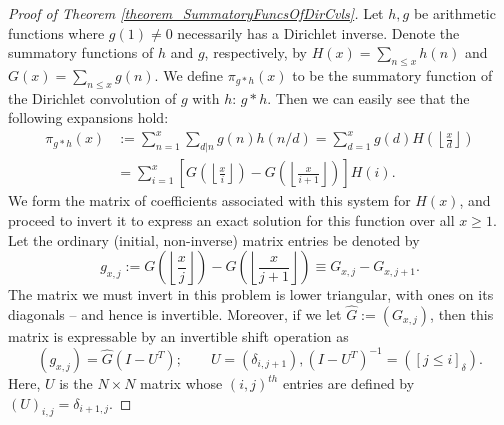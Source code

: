 \documentclass[11pt,reqno,a4letter]{article}
\numberwithin{figure}{section}
\numberwithin{table}{section}
\newcommand{\Iverson}[1]{\ensuremath{\left[#1\right]_{\delta}}}
\newcommand{\floor}[1]{\left\lfloor #1 \right\rfloor}
\theoremstyle{plain}
\numberwithin{theorem}{section}
\theoremstyle{definition}
\begin{document}
\begin{proof}[Proof of Theorem \ref{theorem_SummatoryFuncsOfDirCvls}]
Let $h,g$ be arithmetic functions where $g(1) \neq 0$ 
necessarily has a Dirichlet inverse. Denote the summatory functions of $h$ and $g$, 
respectively, by $H(x) = \sum_{n \leq x} h(n)$ and $G(x) = \sum_{n \leq x} g(n)$. 
We define $\pi_{g \ast h}(x)$ to be the summatory function of the 
Dirichlet convolution of $g$ with $h$: $g \ast h$. 
Then we can easily see that the following expansions hold: 
\begin{align*} 
\pi_{g \ast h}(x) & := \sum_{n=1}^{x} \sum_{d|n} g(n) h(n/d) = \sum_{d=1}^x g(d) H\left(\floor{\frac{x}{d}}\right) \\ 
     & = \sum_{i=1}^x \left[G\left(\floor{\frac{x}{i}}\right) - G\left(\floor{\frac{x}{i+1}}\right)\right] H(i). 
\end{align*} 
We form the matrix of coefficients associated with this system for $H(x)$, and proceed to invert it to express an 
exact solution for this function over all $x \geq 1$. Let the ordinary (initial, non-inverse) matrix entries be denoted by 
\[
g_{x,j} := G\left(\floor{\frac{x}{j}}\right) - G\left(\floor{\frac{x}{j+1}}\right) \equiv G_{x,j} - G_{x,j+1}. 
\]
The matrix we must invert in this problem is lower triangular, with ones on its diagonals -- and hence is invertible. 
Moreover, if we let $\hat{G} := (G_{x,j})$, then this matrix is 
expressable by an invertible shift operation as 
\[
(g_{x,j}) = \hat{G} (I - U^{T}); \qquad U = (\delta_{i,j+1}), (I - U^T)^{-1} = (\Iverson{j \leq i}). 
\]
Here, $U$ is the $N \times N$ matrix whose $(i,j)^{th}$ entries are defined by 
$(U)_{i,j} = \delta_{i+1,j}$. 


\end{proof}
\end{document}

